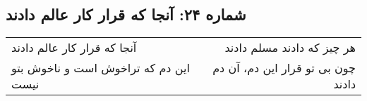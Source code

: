 \begin{center}
\section*{شماره ۲۴: آنجا که قرار کار عالم دادند}
\label{sec:024}
\begin{longtable}{l p{0.5cm} r}
آنجا که قرار کار عالم دادند
&&
هر چیز که دادند مسلم دادند
\\
این دم که تراخوش است و ناخوش بتو نیست
&&
چون بی تو قرار این دم، آن دم دادند
\\
\end{longtable}
\end{center}
